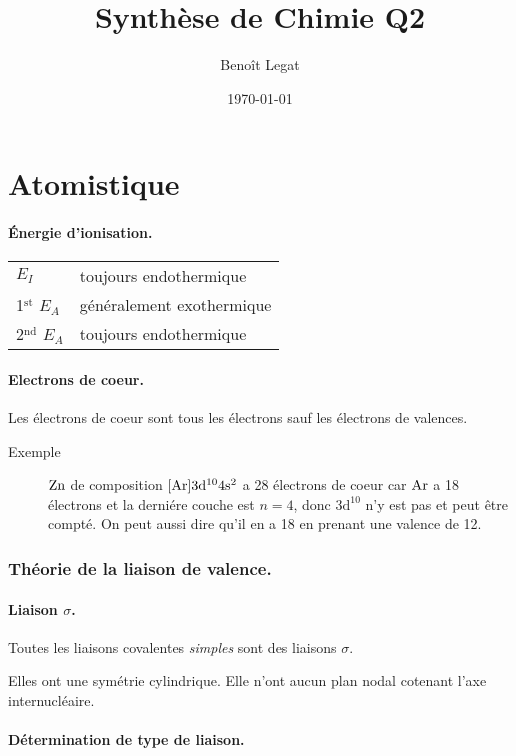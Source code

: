 \documentclass[11pt,a4paper,french]{article}
\title{Synthèse de Chimie Q2}
\author{Beno\^it Legat}
\date{\today}
\begin{document}
\newcommand\sorb{\mathrm{s}}
\newcommand\porb{\mathrm{p}}
\newcommand\dorb{\mathrm{d}}

\maketitle
\part{Atomistique}

\subsection{\'Energie d'ionisation.}
\begin{tabular}{ll}
	$E_I$ & toujours endothermique\\
	1$^{\mathrm{st}}$ $E_A$ & g\'en\'eralement exothermique\\
	2$^{\mathrm{nd}}$ $E_A$ & toujours endothermique
\end{tabular}

\subsection{Electrons de coeur.}
Les \'electrons de coeur sont tous les \'electrons sauf les \'electrons de valences.

\begin{description}
	\item[Exemple]
		$\ce{Zn}$ de composition $[\ce{Ar}]3\dorb^{10}4\sorb^{2}$
		a 28 \'electrons de coeur car $\ce{Ar}$ a 18 \'electrons
		et la derni\'ere couche est $n=4$,
		donc $3\dorb^{10}$ n'y est pas et peut \^etre compt\'e.
		On peut aussi dire qu'il en a 18 en prenant une valence de 12.
\end{description}

\section{Th\'eorie de la liaison de valence.}
\subsection{Liaison $\sigma$.}
Toutes les liaisons covalentes {\it simples} sont des liaisons $\sigma$.

Elles ont une sym\'etrie cylindrique.
Elle n'ont aucun plan nodal cotenant l'axe internucl\'eaire.

\subsection{D\'etermination de type de liaison.}
\end{document}
